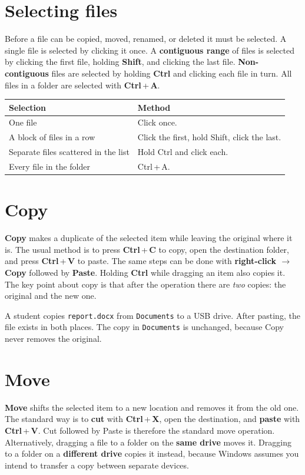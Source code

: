 \section{Selecting files}
Before a file can be copied, moved, renamed, or deleted it must be selected.
A single file is selected by clicking it once. A \textbf{contiguous range} of
files is selected by clicking the first file, holding \textbf{Shift}, and
clicking the last file. \textbf{Non-contiguous} files are selected by holding
\textbf{Ctrl} and clicking each file in turn. All files in a folder are
selected with \textbf{Ctrl}\,+\,\textbf{A}.

\begin{center}
\begin{tabular}{p{}p{}}
\toprule
\textbf{Selection} & \textbf{Method} \\
\midrule
One file & Click once. \\
A block of files in a row & Click the first, hold Shift, click the last. \\
Separate files scattered in the list & Hold Ctrl and click each. \\
Every file in the folder & Ctrl\,+\,A. \\
\bottomrule
\end{tabular}
\end{center}

\section{Copy}
\textbf{Copy} makes a duplicate of the selected item while leaving the
original where it is. The usual method is to press \textbf{Ctrl}\,+\,\textbf{C}
to copy, open the destination folder, and press \textbf{Ctrl}\,+\,\textbf{V}
to paste. The same steps can be done with \textbf{right-click $\rightarrow$
Copy} followed by \textbf{Paste}. Holding \textbf{Ctrl} while dragging an
item also copies it. The key point about copy is that after the operation
there are \emph{two} copies: the original and the new one.

\begin{example}
A student copies \texttt{report.docx} from \texttt{Documents} to a USB drive.
After pasting, the file exists in both places. The copy in
\texttt{Documents} is unchanged, because Copy never removes the original.
\end{example}

\section{Move}
\textbf{Move} shifts the selected item to a new location and removes it from
the old one. The standard way is to \textbf{cut} with
\textbf{Ctrl}\,+\,\textbf{X}, open the destination, and \textbf{paste} with
\textbf{Ctrl}\,+\,\textbf{V}. Cut followed by Paste is therefore the standard
move operation. Alternatively, dragging a file to a folder on the
\textbf{same drive} moves it. Dragging to a folder on a \textbf{different
drive} copies it instead, because Windows assumes you intend to transfer a
copy between separate devices.

